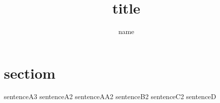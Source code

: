 \documentclass{jarticle}
\title{title}
\author{name}
\begin{document}
\maketitle
\section{sectiom}
sentenceA3
sentenceA2
sentenceAA2
sentenceB2
sentenceC2
sentenceD
\end{document}
